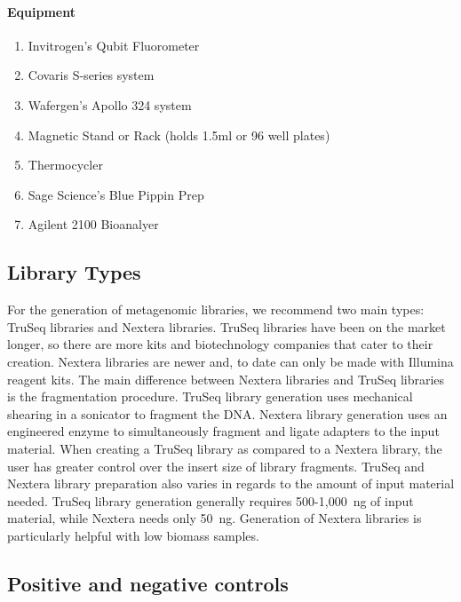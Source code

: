 \documentclass[graybox]{svmult}
\begin{document}
\paragraph{Equipment}
\begin{enumerate}
\item{    Invitrogen’s Qubit Fluorometer}
\item{      Covaris S-series system}
\item{      Wafergen’s Apollo 324 system}
\item{      Magnetic Stand or Rack (holds 1.5ml or 96 well plates)}
\item{      Thermocycler}
\item{      Sage Science’s Blue Pippin Prep}
\item{      Agilent 2100 Bioanalyer}
\end{enumerate}

\subsection{Library Types}
For the generation of metagenomic libraries, we recommend two main types: TruSeq libraries and Nextera libraries.  TruSeq libraries have been on the market longer, so there are more kits and biotechnology companies that cater to their creation. 
Nextera libraries are newer and, to date can only be made with Illumina reagent kits.  
The main difference between Nextera libraries and TruSeq libraries is the fragmentation procedure. 
TruSeq library generation uses mechanical shearing in a sonicator to fragment the DNA. 
Nextera library generation uses an engineered enzyme to simultaneously fragment and ligate adapters to the input material. 
When creating a TruSeq library as compared to a Nextera library, the user has greater control over the insert size of library fragments.  
TruSeq and Nextera library preparation also varies in regards to the amount of input material needed. TruSeq library generation generally requires 500-1,000~ng of input material, while Nextera needs only 50~ng. Generation of Nextera libraries is particularly helpful with low biomass samples.

\subsection{Positive and negative controls }
\end{document}
